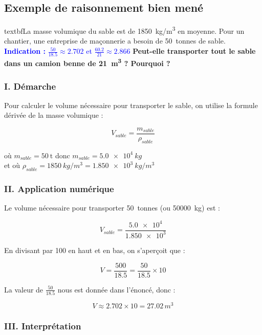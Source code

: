 \documentclass[a4paper,12pt]{article}
\begin{document}
\subsection{Exemple de raisonnement bien mené}

\begin{tcolorbox}[colback=gray!10, colframe=gray!50, title=Notions à maîtriser]

textbf{La masse volumique du sable est de \SI{1850}{kg/m^3} en moyenne. Pour un chantier, une entreprise de maçonnerie a besoin de \SI{50}{tonnes} de sable.}
\textcolor{blue}{\textbf{Indication :} $\frac{50}{18.5} \approx 2.702$ et $\frac{60.2}{21} \approx 2.866$}
\textbf{Peut-elle transporter tout le sable dans un camion benne de \SI{21}{m^3} ? Pourquoi ?}
\end{tcolorbox}

\subsubsection*{I. Démarche}

Pour calculer le volume nécessaire pour transporter le sable, on utilise la formule dérivée de la masse volumique : 

\[
V_{sable} = \frac{m_{sable}}{\rho_{sable}}
\]

où $m_{sable} = \SI{50}{\tonne}$ donc $m_{sable} = \SI{5.0e4}{kg}$ \\
et où $\rho_{sable} = \SI{1850}{kg/m^3} = \SI{1.850e3}{kg/m^3}$

\subsubsection*{II. Application numérique}

Le volume nécessaire pour transporter \SI{50}{tonnes} (ou \SI{50000}{kg}) est :

\[
V_{sable} = \frac{\num{5.0e4}}{\num{1.850e3}}
\]

En divisant par 100 en haut et en bas, on s'aperçoit que :

\[
V = \frac{500}{18.5} = \frac{50}{18.5} \times 10
\]

La valeur de $\frac{50}{18.5}$ nous est donnée dans l'énoncé, donc :

\[
V \approx 2.702 \times 10 = 27.02\,\si{m^3}
\]

\subsubsection*{III. Interprétation}
\end{document}
